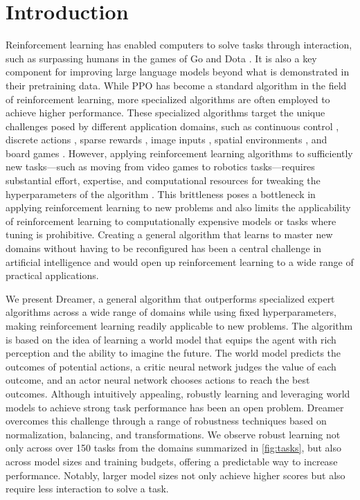 

\enlargethispage{2ex}

\section*{Introduction}
\label{sec:intro}

Reinforcement learning has enabled computers to solve tasks through interaction, such as surpassing humans in the games of Go and Dota \citep{silver2016alphago,openai2018dota}.
It is also a key component for improving large language models beyond what is demonstrated in their pretraining data\citep{ouyang2022rlhf,le2022coderl}.
While PPO \citep{schulman2017ppo} has become a standard algorithm in the field of reinforcement learning, more specialized algorithms are often employed to achieve higher performance.
These specialized algorithms target the unique challenges posed by different application domains, such as continuous control \citep{lillicrap2015ddpg}, discrete actions \citep{mnih2015dqn,schrittwieser2019muzero}, sparse rewards \citep{jaderberg2016unreal}, image inputs \citep{anand2019ataristaterep}, spatial environments \citep{driess2022nerfrl}, and board games \citep{silver2017alphago}.
However, applying reinforcement learning algorithms to sufficiently new tasks---such as moving from video games to robotics tasks---requires substantial effort, expertise, and computational resources for tweaking the hyperparameters of the algorithm \citep{andrychowicz2020whatmatters}.
This brittleness poses a bottleneck in applying reinforcement learning to new problems and also limits the applicability of reinforcement learning to computationally expensive models or tasks where tuning is prohibitive.
Creating a general algorithm that learns to master new domains without having to be reconfigured has been a central challenge in artificial intelligence and would open up reinforcement learning to a wide range of practical applications.

We present Dreamer, a general algorithm that outperforms specialized expert algorithms across a wide range of domains while using fixed hyperparameters, making reinforcement learning readily applicable to new problems.
The algorithm is based on the idea of learning a world model that equips the agent with rich perception and the ability to imagine the future\citep{sutton1991dyna,finn2017visualforesight,ha2018worldmodels}.
The world model predicts the outcomes of potential actions, a critic neural network judges the value of each outcome, and an actor neural network chooses actions to reach the best outcomes.
Although intuitively appealing, robustly learning and leveraging world models to achieve strong task performance has been an open problem\citep{kaiser2019simple}.
Dreamer overcomes this challenge through a range of robustness techniques based on normalization, balancing, and transformations.
We observe robust learning not only across over 150 tasks from the domains summarized in \cref{fig:tasks}, but also across model sizes and training budgets, offering a predictable way to increase performance.
Notably, larger model sizes not only achieve higher scores but also require less interaction to solve a task.

